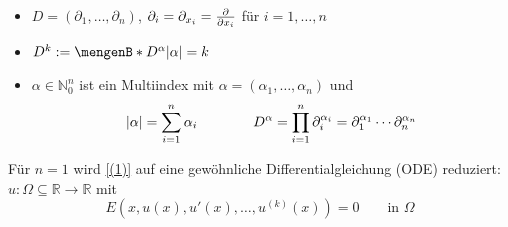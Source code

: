 \begin{notation}
\begin{itemize}
	\item $D = (\partial_1, \dots , \partial_n)$, $\partial_i = \partial_{x_i} = \frac{{\partial }}{{\partial x_i}} $ für $i=1,\dots,n$
	\item $D^k:= \set[D^{\alpha }]{\abs{\alpha }=k}$
	\item $\alpha \in \mathbb{N}_0^n$ ist ein Multiindex mit $\alpha = (\alpha_1, \dots, \alpha_n)$ und
	\[
		\lvert\alpha\rvert = \sum^{n}_{i=1}\alpha_i \qquad \qquad D^{\alpha}= \prod\limits_{i=1}^{n}\partial_i^{\alpha_i} = \partial_1^{\alpha_1} \cdots \partial_n^{\alpha_n}
	\]
\end{itemize}
\end{notation}

\begin{bemerkung}
Für $n=1$ wird \eqref{(1)} auf eine gewöhnliche Differentialgleichung (ODE) reduziert: $u: \Omega \subseteq \mathbb{R} \to \mathbb{R}$ mit
\[
	E(x,u(x),u'(x),\dots,u^{(k)}(x))=0 \qquad \text{in } \Omega
\]
\end{bemerkung}

